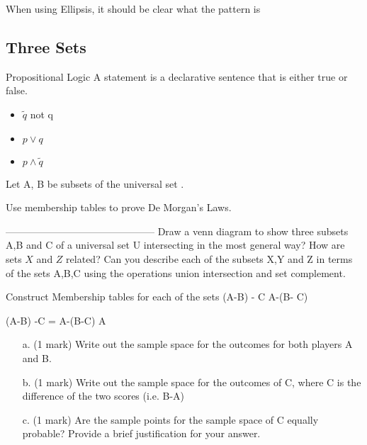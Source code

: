 

When using Ellipsis, it should be clear what the pattern is











\subsection*{ Three Sets }






Propositional Logic A statement is a declarative sentence that
is either true or false.
\begin{itemize}
\item $\tilde q$ not q \item $p \vee q$ \item $p \wedge \tilde
q$
\end{itemize}


\item 
Let A, B be subsets of the universal set .

Use membership tables to prove De Morgan's Laws.

---------------------------------------------
Draw a venn diagram to show three subsets A,B and C of a universal set U intersecting in
the most general way?
How are sets $X$ and $Z$ related?
Can you describe each of the subsets X,Y and Z in terms  of the
sets A,B,C using the operations union intersection and set complement.

Construct Membership tables for each of the sets
(A-B) - C
A-(B- C)

(A-B) -C = A-(B-C)
A



\begin{itemize}
\item[a.] (1 mark) Write out the sample space for the outcomes for both players A and B.
\item[b.] (1 mark) Write out the sample space for the outcomes of C, where C is the difference of the two scores (i.e. B-A)
\item[c.] (1 mark) Are the sample points for the sample space of C equally probable? Provide a brief justification for your answer.
\end{itemize}

